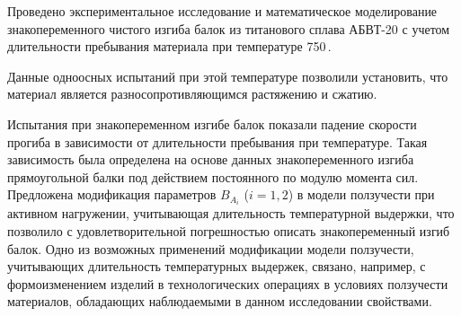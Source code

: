 
Проведено экспериментальное исследование и математическое моделирование знакопеременного чистого изгиба балок из титанового сплава АБВТ-20 с учетом длительности пребывания материала при температуре 750\,\textcelsius. 

Данные одноосных испытаний при этой температуре позволили установить, что материал является разносопротивляющимся растяжению и сжатию. 

Испытания при знакопеременном изгибе балок показали падение скорости прогиба в зависимости от длительности пребывания при температуре. Такая зависимость была определена на основе данных знакопеременного изгиба прямоугольной балки под действием постоянного по модулю момента сил. Предложена модификация параметров $B_{A_i}$ ($i=1,2$) в модели ползучести при активном нагружении, учитывающая длительность температурной выдержки, что позволило с удовлетворительной погрешностью описать знакопеременный изгиб балок. Одно из возможных применений модификации модели ползучести, учитывающих длительность температурных выдержек, связано, например, с формоизменением изделий в технологических операциях в условиях ползучести материалов, обладающих наблюдаемыми в данном исследовании свойствами.













